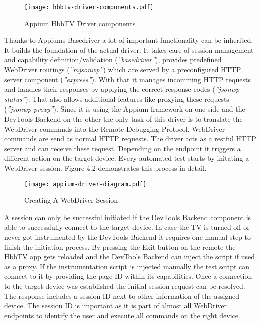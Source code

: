 \vspace{1cm}
\begin{figure}[htb]
  \centering
  \texttt{[image: hbbtv-driver-components.pdf]}\\
  \caption{Appium HbbTV Driver components}\label{fig:hbbtv-driver-components}
\end{figure}
\vspace{0.5cm}

Thanks to Appiums Basedriver a lot of important functionality can be inherited. It builds the
foundation of the actual driver. It takes care of session management and capability definition/validation
(\textit{''basedriver''}), provides predefined WebDriver routings (\textit{''mjsonwp''}) which are
served by a preconfigured HTTP server component (\textit{''express''}). With that it manages incomming
HTTP requests and handles their responses by applying the correct response codes (\textit{''jsonwp-status''}).
That also allows additional features like proxying these requests (\textit{''jsonwp-proxy''}).
Since it is using the Appium framework on one side and the DevTools Backend on the other the only
task of this driver is to translate the WebDriver commands into the Remote Debugging Protocol.
WebDriver commands are send as normal HTTP requests. The driver acts as a restful HTTP server
and can receive these request. Depending on the endpoint it triggers a different action on the
target device. Every automated test starts by initating a WebDriver session. Figure 4.2 demonstrates
this process in detail.

\vspace{1cm}
\begin{figure}[htb]
  \centering
  \texttt{[image: appium-driver-diagram.pdf]}\\
  \caption{Creating A WebDriver Session}\label{fig:appium-driver-diagram}
\end{figure}
\vspace{0.5cm}

A session can only be successful initiated if the DevTools Backend component is able to successfully
connect to the target device. In case the TV is turned off or never got instrumented by the DevTools
Backend it requires one manual step to finish the initiation process. By pressing the Exit button
on the remote the HbbTV app gets reloaded and the DevTools Backend can inject the script if used as
a proxy. If the instrumentation script is injected manually the test script can connect to it by
providing the page ID within its capabilities. Once a connection to the target device was established
the initial session request can be resolved. The response includes a session ID next to other
information of the assigned device. The session ID is important as it is part of almost all WebDriver
endpoints to identify the user and execute all commands on the right device.

